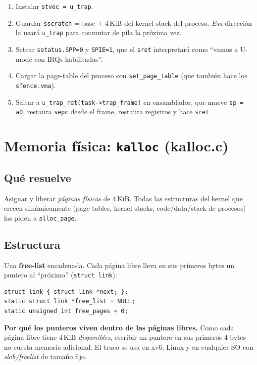\documentclass[11pt,a4paper]{article}
\begin{document}
\begin{enumerate}[leftmargin=*,nosep]
    \item Instalar \texttt{stvec = u\_trap}.
    \item Guardar \texttt{sscratch} = base + 4\,KiB del kernel-stack
        del proceso. \emph{Esa} dirección la usará \texttt{u\_trap}
        para conmutar de pila la próxima vez.
    \item Setear \texttt{sstatus.SPP=0} y \texttt{SPIE=1}, que el
        \texttt{sret} interpretará como ``vamos a U-mode con IRQs
        habilitadas''.
    \item Cargar la page-table del proceso con \texttt{set\_page\_table}
        (que también hace los \texttt{sfence.vma}).
    \item Saltar a \texttt{u\_trap\_ret(task->trap\_frame)} en
        ensamblador, que mueve \texttt{sp = a0}, restaura
        \texttt{sepc} desde el frame, restaura registros y hace
        \texttt{sret}.
\end{enumerate}

\section{Memoria física: \texttt{kalloc} (kalloc.c)}

\subsection*{Qué resuelve}

Asignar y liberar \emph{páginas físicas} de 4\,KiB. Todas las
estructuras del kernel que crecen dinámicamente (page tables, kernel
stacks, code/data/stack de procesos) las piden a \texttt{alloc\_page}.

\subsection*{Estructura}

Una \textbf{free-list} encadenada. Cada página libre lleva en sus
primeros bytes un puntero al ``próximo'' (\texttt{struct link}):

\begin{lstlisting}[style=cstyle]
struct link { struct link *next; };
static struct link *free_list = NULL;
static unsigned int free_pages = 0;
\end{lstlisting}

\begin{idea}
\textbf{Por qué los punteros viven dentro de las páginas libres.}
Como cada página libre tiene 4\,KiB \emph{disponibles}, escribir un
puntero en sus primeros 4 bytes no cuesta memoria adicional. El
truco se usa en xv6, Linux y en cualquier SO con \emph{slab/freelist}
de tamaño fijo.
\end{idea}
\end{document}
